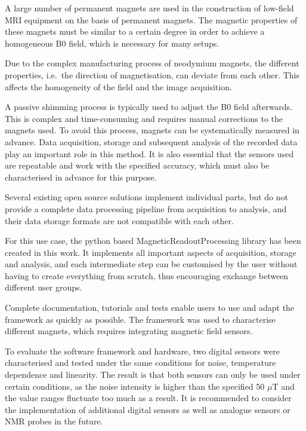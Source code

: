 A large number of permanent magnets are used in the construction of
low-field MRI equipment on the basis of permanent magnets. The magnetic
properties of these magnets must be similar to a certain degree in order
to achieve a homogeneous B0 field, which is necessary for many setups.

Due to the complex manufacturing process of neodymium magnets, the
different properties, i.e.~the direction of magnetisation, can deviate
from each other. This affects the homogeneity of the field and the image
acquisition.

A passive shimming process is typically used to adjust the B0 field
afterwards. This is complex and time-consuming and requires manual
corrections to the magnets used. To avoid this process, magnets can be
systematically measured in advance. Data acquisition, storage and
subsequent analysis of the recorded data play an important role in this
method. It is also essential that the sensors used are repeatable and
work with the specified accuracy, which must also be characterised in
advance for this purpose.

Several existing open source solutions implement individual parts, but
do not provide a complete data processing pipeline from acquisition to
analysis, and their data storage formats are not compatible with each
other.

For this use case, the python based MagneticReadoutProcessing library
has been created in this work. It implements all important aspects of
acquisition, storage and analysis, and each intermediate step can be
customised by the user without having to create everything from scratch,
thus encouraging exchange between different user groups.

Complete documentation, tutorials and tests enable users to use and
adapt the framework as quickly as possible. The framework was used to
characterise different magnets, which requires integrating magnetic
field sensors.

To evaluate the software framework and hardware, two digital sensors
were characterised and tested under the same conditions for noise,
temperature dependence and linearity. The result is that both sensors
can only be used under certain conditions, as the noise intensity is
higher than the specified 50 \(\mu\)T and the value ranges fluctuate too
much as a result. It is recommended to consider the implementation of
additional digital sensors as well as analogue sensors or NMR probes in
the future.
